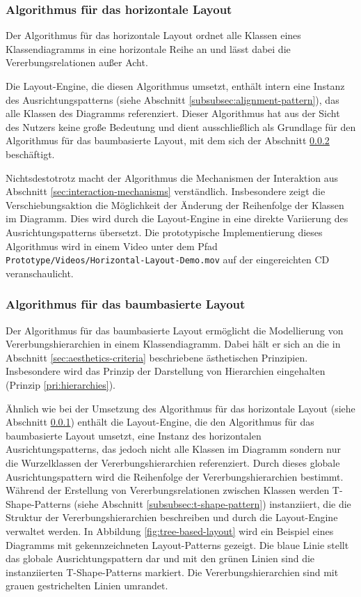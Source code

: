 \subsubsection{Algorithmus für das horizontale Layout}
\label{subsubsec:horizontal-layout-algorithm}

Der Algorithmus für das horizontale Layout ordnet alle Klassen eines Klassendiagramms in eine horizontale Reihe an und lässt dabei die Vererbungsrelationen außer Acht.

Die Layout-Engine, die diesen Algorithmus umsetzt, enthält intern eine Instanz des Ausrichtungspatterns (siehe Abschnitt \ref{subsubsec:alignment-pattern}), das alle Klassen des Diagramms referenziert. Dieser Algorithmus hat aus der Sicht des Nutzers keine große Bedeutung und dient ausschließlich als Grundlage für den Algorithmus für das baumbasierte Layout, mit dem sich der Abschnitt \ref{subsubsec:tree-layout-algorithm} beschäftigt.

Nichtsdestotrotz macht der Algorithmus die Mechanismen der Interaktion aus Abschnitt \ref{sec:interaction-mechanisms} verständlich. Insbesondere zeigt die Verschiebungsaktion die Möglichkeit der Änderung der Reihenfolge der Klassen im Diagramm. Dies wird durch die Layout-Engine in eine direkte Variierung des Ausrichtungspatterns übersetzt. Die prototypische Implementierung dieses Algorithmus wird in einem Video unter dem Pfad \texttt{Prototype/Videos/Hori\-zon\-tal-\-Lay\-out-\-De\-mo.mov} auf der eingereichten CD veranschaulicht.

\subsubsection{Algorithmus für das baumbasierte Layout}
\label{subsubsec:tree-layout-algorithm}

Der Algorithmus für das baumbasierte Layout ermöglicht die Modellierung von Vererbungshierarchien in einem Klassendiagramm. Dabei hält er sich an die in Abschnitt \ref{sec:aesthetics-criteria} beschriebene ästhetischen Prinzipien. Insbesondere wird das Prinzip der Darstellung von Hierarchien eingehalten (Prinzip \ref{pri:hierarchies}).

Ähnlich wie bei der Umsetzung des Algorithmus für das horizontale Layout (siehe Abschnitt \ref{subsubsec:horizontal-layout-algorithm}) enthält die Layout-Engine, die den Algorithmus für das baumbasierte Layout umsetzt, eine Instanz des horizontalen Ausrichtungspatterns, das jedoch nicht alle Klassen im Diagramm sondern nur die Wurzelklassen der Vererbungshierarchien referenziert. Durch dieses globale Ausrichtungspattern wird die Reihenfolge der Vererbungshierarchien bestimmt. Während der Erstellung von Vererbungsrelationen zwischen Klassen werden T-Shape-Patterns (siehe Abschnitt \ref{subsubsec:t-shape-pattern}) instanziiert, die die Struktur der Vererbungshierarchien beschreiben und durch die Layout-Engine verwaltet werden. In Abbildung \ref{fig:tree-based-layout} wird ein Beispiel eines Diagramms mit gekennzeichneten Layout-Patterns gezeigt. Die blaue Linie stellt das globale Ausrichtungspattern dar und mit den grünen Linien sind die instanziierten T-Shape-Patterns markiert. Die Vererbungshierarchien sind mit grauen gestrichelten Linien umrandet.

